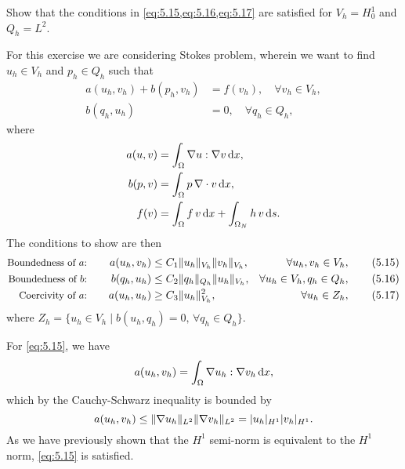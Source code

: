 \begin{exercise}{5.1}
    Show that the conditions in \cref{eq:5.15,eq:5.16,eq:5.17} are satisfied for $V_h = H^1_0$ and $Q_h = L^2$.
\end{exercise}

\begin{solution}{5.1}
    For this exercise we are considering Stokes problem, wherein we want to find $u_h \in V_h$ and $p_h \in Q_h$ such that
    \begin{equation}
        \begin{split}
            a(u_h, v_h) + b(p_h, v_h) &= f(v_h), \quad \forall v_h \in V_h, \\
            b(q_h, u_h) &= 0, \quad \forall q_h \in Q_h,
        \end{split}
    \end{equation}
    where
    \begin{equation}
        \begin{split}
            a(u, v) &= \int_{\Omega} \nabla u : \nabla v \mathop{}\!\mathrm{d} x, \\
            b(p, v) &= \int_{\Omega} p \, \nabla \cdot v \mathop{}\!\mathrm{d} x, \\
            f(v) &= \int_{\Omega} f \, v \mathop{}\!\mathrm{d} x + \int_{\Omega_N} h \, v \mathop{}\!\mathrm{d} s.
        \end{split}
    \end{equation}
    The conditions to show are then
    \begin{align}
        \text{\small Boundedness of $a$:}
        && \quad a(u_h, v_h) &\leq C_1 \lVert u_h\rVert_{V_h} \lVert v_h\rVert_{V_h},
        & \forall u_h, v_h \in V_h,
        \tag{5.15} \label{eq:5.15}
        \\
        \text{\small Boundedness of $b$:}
        && \quad b(q_h, u_h) &\leq C_2 \lVert q_h\rVert_{Q_h} \lVert u_h\rVert_{V_h},
        & \forall u_h \in V_h, q_h \in Q_h,
        \tag{5.16} \label{eq:5.16}
        \\
        \text{\small Coercivity of $a$:}
        && \quad a(u_h, u_h) &\geq C_3 \lVert u_h\rVert_{V_h}^2,
        & \forall u_h \in Z_h,
        \tag{5.17} \label{eq:5.17}
    \end{align}
    where $Z_h = \{ u_h \in V_h \mid b(u_h, q_h) = 0, \, \forall q_h \in Q_h \}$.

    For \cref{eq:5.15}, we have
    \begin{equation}
        a(u_h, v_h) = \int_{\Omega} \nabla u_h : \nabla v_h \mathop{}\!\mathrm{d} x,
    \end{equation}
    which by the Cauchy-Schwarz inequality is bounded by
    \begin{equation}
        a(u_h, v_h) \leq \lVert\nabla u_h\rVert_{L^2} \lVert\nabla v_h\rVert_{L^2} = \lvert u_h\rvert_{H^1} \lvert v_h\rvert_{H^1}.
    \end{equation}
    As we have previously shown that the $H^1$ semi-norm is equivalent to the $H^1$ norm, \cref{eq:5.15} is satisfied.


\end{solution}
